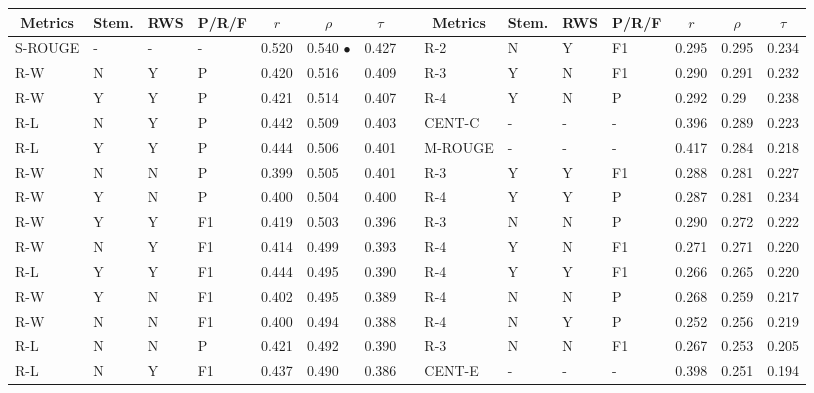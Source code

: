 \documentclass[11pt,a4paper]{article}
\begin{document}
\begin{table}[]
{
\scriptsize
\centering
\begin{tabular}{lllllllllllllll}
\hline
\multicolumn{1}{c}{Metrics} & \multicolumn{1}{c}{Stem.} & \multicolumn{1}{c}{RWS} & \multicolumn{1}{c}{P/R/F} & \multicolumn{1}{c}{$r$} & \multicolumn{1}{c}{$\rho$} & \multicolumn{1}{c}{$\tau$} & \multicolumn{1}{c}{} & \multicolumn{1}{c}{Metrics} & \multicolumn{1}{c}{Stem.} & \multicolumn{1}{c}{RWS} & \multicolumn{1}{c}{P/R/F} & \multicolumn{1}{c}{$r$} & \multicolumn{1}{c}{$\rho$} & \multicolumn{1}{c}{$\tau$} \\ \hline
\textsc{S-ROUGE} & - & - & - & 0.520 & 0.540 $\bullet$ & 0.427 &  & \textsc{R-2} & N & Y & F1 & 0.295 & 0.295 & 0.234 \\
\textsc{R-W} & N & Y & P & 0.420 & 0.516 & 0.409 &  & \textsc{R-3} & Y & N & F1 & 0.290 & 0.291 & 0.232 \\
\textsc{R-W} & Y & Y & P & 0.421 & 0.514 & 0.407 &  & \textsc{R-4} & Y & N & P & 0.292 & 0.29 & 0.238 \\
\textsc{R-L} & N & Y & P & 0.442 & 0.509 & 0.403 &  & \textsc{CENT-C} & - & - & - & 0.396 & 0.289 & 0.223 \\
\textsc{R-L} & Y & Y & P & 0.444 & 0.506 & 0.401 &  & \textsc{M-ROUGE} & - & - & - & 0.417 & 0.284 & 0.218 \\
\textsc{R-W} & N & N & P & 0.399 & 0.505 & 0.401 &  & \textsc{R-3} & Y & Y & F1 & 0.288 & 0.281 & 0.227 \\
\textsc{R-W} & Y & N & P & 0.400 & 0.504 & 0.400 &  & \textsc{R-4} & Y & Y & P & 0.287 & 0.281 & 0.234 \\
\textsc{R-W} & Y & Y & F1 & 0.419 & 0.503 & 0.396 &  & \textsc{R-3} & N & N & P & 0.290 & 0.272 & 0.222 \\
\textsc{R-W} & N & Y & F1 & 0.414 & 0.499 & 0.393 &  & \textsc{R-4} & Y & N & F1 & 0.271 & 0.271 & 0.220 \\
\textsc{R-L} & Y & Y & F1 & 0.444 & 0.495 & 0.390 &  & \textsc{R-4} & Y & Y & F1 & 0.266 & 0.265 & 0.220 \\
\textsc{R-W} & Y & N & F1 & 0.402 & 0.495 & 0.389 &  & \textsc{R-4} & N & N & P & 0.268 & 0.259 & 0.217 \\
\textsc{R-W} & N & N & F1 & 0.400 & 0.494 & 0.388 &  & \textsc{R-4} & N & Y & P & 0.252 & 0.256 & 0.219 \\
\textsc{R-L} & N & N & P & 0.421 & 0.492 & 0.390 &  & \textsc{R-3} & N & N & F1 & 0.267 & 0.253 & 0.205 \\
\textsc{R-L} & N & Y & F1 & 0.437 & 0.490 & 0.386 &  & \textsc{CENT-E} & - & - & - & 0.398 & 0.251 & 0.194 \\

\end{tabular}}
\end{table}
\end{document}
